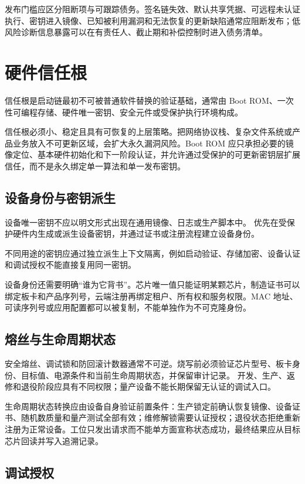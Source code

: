 发布门槛应区分阻断项与可跟踪债务。签名链失效、默认共享凭据、可远程未认证执行、密钥进入镜像、已知被利用漏洞和无法恢复的更新缺陷通常应阻断发布；低风险诊断信息暴露可以在有责任人、截止期和补偿控制时进入债务清单。

\section{硬件信任根}

信任根是启动链最初不可被普通软件替换的验证基础，通常由 Boot ROM、一次性可编程存储、硬件唯一密钥、安全元件或受保护执行环境构成。

信任根必须小、稳定且具有可恢复的上层策略。把网络协议栈、复杂文件系统或产品业务放入不可更新区域，会扩大永久漏洞风险。Boot ROM 应只承担必要的镜像定位、基本硬件初始化和下一阶段认证，并允许通过受保护的可更新密钥层扩展信任，而不是永久绑定单一算法和单一发布密钥。

\subsection{设备身份与密钥派生}

设备唯一密钥不应以明文形式出现在通用镜像、日志或生产脚本中。
优先在受保护硬件内生成或派生设备密钥，并通过证书或注册流程建立设备身份。

不同用途的密钥应通过独立派生上下文隔离，例如启动验证、存储加密、设备认证和调试授权不能直接复用同一密钥。

设备身份还需要明确“谁为它背书”。芯片唯一值只能证明某颗芯片，制造证书可以绑定板卡和产品序列号，云端注册再绑定租户、所有权和服务权限。MAC 地址、可读序列号或应用配置都可以被复制，不能单独作为不可克隆身份。

\subsection{熔丝与生命周期状态}

安全熔丝、调试锁和防回滚计数器通常不可逆。烧写前必须验证芯片型号、板卡身份、目标值、电源条件和当前生命周期状态，并保留审计记录。
开发、生产、返修和退役阶段应具有不同权限；量产设备不能长期保留无认证的调试入口。

生命周期状态转换应由设备自身验证前置条件：生产锁定前确认恢复镜像、设备证书、随机数质量和量产测试全部有效；维修解锁需要认证授权；退役状态拒绝重新注册为正常设备。工位只发出请求而不能单方面宣称状态成功，最终结果应从目标芯片回读并写入追溯记录。

\subsection{调试授权}

